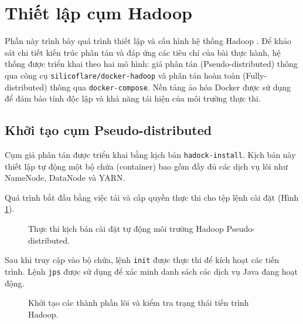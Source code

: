 \section{Thiết lập cụm Hadoop}

Phần này trình bày quá trình thiết lập và cấu hình hệ thống Hadoop \cite{white2012hadoop}. Để khảo sát chi tiết kiến trúc phân tán và đáp ứng các tiêu chí của bài thực hành, hệ thống được triển khai theo hai mô hình: giả phân tán (Pseudo-distributed) thông qua công cụ \texttt{silicoflare/docker-hadoop} và phân tán hoàn toàn (Fully-distributed) thông qua \texttt{docker-compose}. Nền tảng ảo hóa Docker được sử dụng để đảm bảo tính độc lập và khả năng tái hiện của môi trường thực thi.

\subsection{Khởi tạo cụm Pseudo-distributed}
Cụm giả phân tán được triển khai bằng kịch bản \texttt{hadock-install}. Kịch bản này thiết lập tự động một bộ chứa (container) bao gồm đầy đủ các dịch vụ lõi như NameNode, DataNode và YARN.

Quá trình bắt đầu bằng việc tải và cấp quyền thực thi cho tệp lệnh cài đặt (Hình \ref{fig:hadock_install}). 

\begin{figure}[H]
    \centering
    \caption{Thực thi kịch bản cài đặt tự động môi trường Hadoop Pseudo-distributed.}
    \label{fig:hadock_install}
\end{figure}

Sau khi truy cập vào bộ chứa, lệnh \texttt{init} được thực thi để kích hoạt các tiến trình. Lệnh \texttt{jps} được sử dụng để xác minh danh sách các dịch vụ Java đang hoạt động.

\begin{figure}[H]
    \centering
    \caption{Khởi tạo các thành phần lõi và kiểm tra trạng thái tiến trình Hadoop.}
    \label{fig:hadock_init}
\end{figure}

